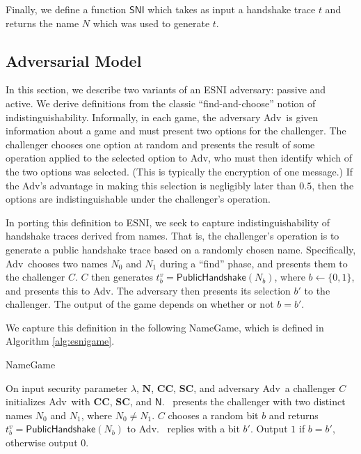 \documentclass{article}
\newcommand{\adv}{{\sf Adv}}
\theoremstyle{definition}
\begin{document}
Finally, we define a function $\mathsf{SNI}$ which takes as input a handshake trace $t$
and returns the name $N$ which was used to generate $t$. 

\subsection{Adversarial Model}

In this section, we describe two variants of an ESNI adversary: passive and active. We derive 
definitions from the classic ``find-and-choose'' notion of indistinguishability. Informally, 
in each game, the adversary \adv\ is given information about a game and must present two options
for the challenger. The challenger chooses one option at random and presents the result of some 
operation applied to the selected option to \adv, who must then identify which of 
the two options was selected. (This is typically the encryption of one message.) If the 
\adv's advantage in making this selection is negligibly later than $0.5$, then the options 
are indistinguishable under the challenger's operation.

In porting this definition to ESNI, we seek to capture indistinguishability of handshake traces
derived from names. That is, the challenger's operation is to generate a public handshake trace 
based on a randomly chosen name. Specifically, \adv\ chooses two names $N_0$ and $N_1$ during
a ``find'' phase, and presents them to the challenger $C$. $C$ then generates 
$t_b^v = \mathsf{PublicHandshake}(N_b)$, where $b \gets \{0,1\}$, and presents this to \adv. 
The adversary then presents its selection $b'$ to the challenger. The output of the game
depends on whether or not $b = b'$. 

We capture this definition in the following {\sf NameGame}, which is defined in Algorithm \ref{alg:esnigame}.

\begin{algorithm}
\caption{{\sf NameGame}} 
\label{alg:esnigame}
\begin{algorithmic}[1]
  \STATE On input security parameter $\lambda$, $\mathbf{N}$, $\mathbf{CC}$, $\mathbf{SC}$, 
  and adversary \adv\, a challenger $C$ initializes \adv\ with $\mathbf{CC}$, $\mathbf{SC}$, and $\mathsf{N}$. 
  \STATE \adv\ presents the challenger with two distinct names $N_0$ and $N_1$, where $N_0 \not= N_1$.
  \STATE $C$ chooses a random bit $b$ and returns $t_b^v = \mathsf{PublicHandshake}(N_b)$ to \adv.
  \STATE \adv\ replies with a bit $b'$.
  \STATE Output $1$ if $b = b'$, otherwise output $0$.
\end{algorithmic}
\end{algorithm}
\end{document}
